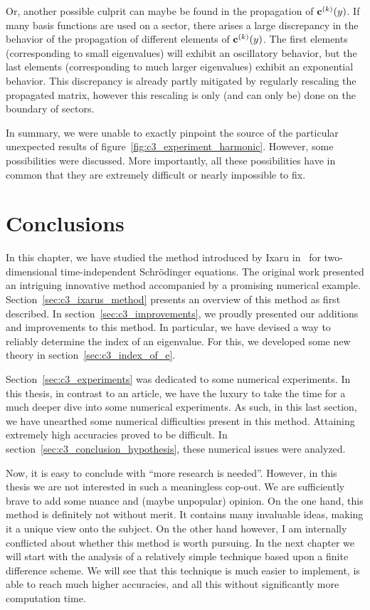 Or, another possible culprit can maybe be found in the propagation of $\vb{c}^{(k)}(y)$. If many basis functions are used on a sector, there arises a large discrepancy in the behavior of the propagation of different elements of $\vb{c}^{(k)}(y)$. The first elements (corresponding to small eigenvalues) will exhibit an oscillatory behavior, but the last elements (corresponding to much larger eigenvalues) exhibit an exponential behavior. This discrepancy is already partly mitigated by regularly rescaling the propagated matrix, however this rescaling is only (and can only be) done on the boundary of sectors.

In summary, we were unable to exactly pinpoint the source of the particular unexpected results of figure~\ref{fig:c3_experiment_harmonic}. However, some possibilities were discussed. More importantly, all these possibilities have in common that they are extremely difficult or nearly impossible to fix.


\section{Conclusions}

In this chapter, we have studied the method introduced by Ixaru in~\cite{ixaru_new_2010} for two-dimensional time-independent Schrödinger equations. The original work presented an intriguing innovative method accompanied by a promising numerical example. Section~\ref{sec:c3_ixarus_method} presents an overview of this method as first described. In section~\ref{sec:c3_improvements}, we proudly presented our additions and improvements to this method. In particular, we have devised a way to reliably determine the index of an eigenvalue. For this, we developed some new theory in section~\ref{sec:c3_index_of_e}.

Section~\ref{sec:c3_experiments} was dedicated to some numerical experiments. In this thesis, in contrast to an article, we have the luxury to take the time for a much deeper dive into some numerical experiments. As such, in this last section, we have unearthed some numerical difficulties present in this method. Attaining extremely high accuracies proved to be difficult. In section~\ref{sec:c3_conclusion_hypothesis}, these numerical issues were analyzed.

Now, it is easy to conclude with ``more research is needed''. However, in this thesis we are not interested in such a meaningless cop-out. We are sufficiently brave to add some nuance and (maybe unpopular) opinion. On the one hand, this method is definitely not without merit. It contains many invaluable ideas, making it a unique view onto the subject. On the other hand however, I am internally conflicted about whether this method is worth pursuing. In the next chapter we will start with the analysis of a relatively simple technique based upon a finite difference scheme. We will see that this technique is much easier to implement, is able to reach much higher accuracies, and all this without significantly more computation time.

